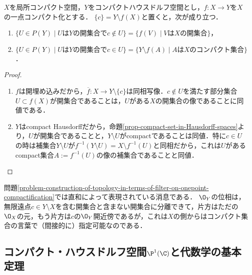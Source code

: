 \documentclass[uplatex,dvipdfmx]{jsreport}
\begin{document}
\begin{lemma}
    $X$を局所コンパクト空間，$Y$をコンパクトハウスドルフ空間とし，$f:X\to Y$を$X$の一点コンパクト化とする．
    $\{c\}=Y\setminus f(X)$と置くと，次が成り立つ．
    \begin{enumerate}
        \item $\{U\in P(Y)\mid UはYの開集合でc\notin U\}=\{f(V)\mid VはXの開集合\}$，
        \item $\{U\in P(Y)\mid UはYの開集合でc\in U\}=\{Y\setminus f(A)\mid AはXのコンパクト集合\}$．
    \end{enumerate}
\end{lemma}
\begin{proof}\mbox{}
    \begin{enumerate}
        \item $f$は開埋め込みだから，$\overline{f}:X\to Y\setminus\{c\}$は同相写像．$c\notin U$を満たす部分集合$U\subset f(X)$が開集合であることは，$U$がある$X$の開集合の像であることに同値である．
        \item $Y$はcompact Hausdorffだから，命題\ref{prop-compact-set-in-Hausdorff-spaces}より，$U$が開集合であることと，$Y\setminus U$がcompactであることは同値．特に$c\in U$の時は補集合$Y\setminus U$が$f^{-1}(Y\setminus U)=X\setminus f^{-1}(U)$と同相だから，これは$U$があるcompact集合$A:=f^{-1}(U)$の像の補集合であることと同値．
    \end{enumerate}
\end{proof}
\begin{remarks}
    問題\ref{problem-construction-of-topology-in-terms-of-filter-on-onepoint-compactification}では直和によって表現されている消息である．
    $\O_Y$の位相は，無限遠点$c\in Y\setminus X$を含む開集合と含まない開集合に分離できて，片方はただの$\O_X$の元，もう片方は$c$の$\O_Y$開近傍であるが，これは$X$の側からはコンパクト集合の言葉で（間接的に）指定可能なのである．
\end{remarks}

\subsection{コンパクト・ハウスドルフ空間$\P^1(\C)$と代数学の基本定理}
\end{document}
